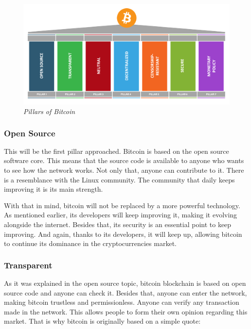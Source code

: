 \documentclass{article}
\newcommand\tab[1][1cm]{\hspace*{#1}}
\begin{document}
\begin{figure}[H]
    \begin{center}
        \includegraphics[width=\textwidth]{images/pillars.png}
        \caption{\textit{Pillars of Bitcoin}}
    \end{center}
\end{figure}

\subsubsection{Open Source}

\tab This will be the first pillar approached. Bitcoin is based on the open source software core. This means that the source code is available to anyone who wants to see how the network works. Not only that, anyone can contribute to it. There is a resemblance with the Linux community. The community that daily keeps improving it is its main strength.

With that in mind, bitcoin will not be replaced by a more powerful technology. As mentioned earlier, its developers will keep improving it, making it evolving alongside the internet. Besides that, its security is an essential point to keep improving. And again, thanks to its developers, it will keep up, allowing bitcoin to continue its dominance in the cryptocurrencies market.

\subsubsection{Transparent}

\tab As it was explained in the open source topic, bitcoin blockchain is based on open source code and anyone can check it. Besides that, anyone can enter the network, making bitcoin trustless and permissionless. Anyone can verify any transaction made in the network. This allows people to form their own opinion regarding this market. That is why bitcoin is originally based on a simple quote:
\end{document}
